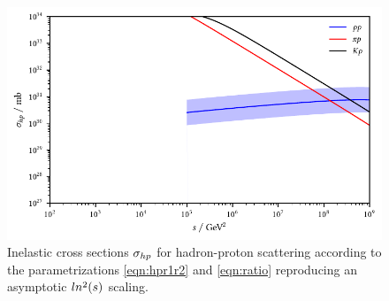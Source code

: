 \begin{figure}[H]
	\centering
	\includegraphics{../plots/build/hadron_proton_scattering.pdf}
	\caption[Inelastic cross sections $\sigma_{h \kern-0.1pt p}$ for hadron-proton scattering.]{Inelastic cross sections
			 $\sigma_{h \kern-0.1pt p}$ for hadron-proton scattering according to the parametrizations \eqref{eqn:hpr1r2}
			 and \eqref{eqn:ratio} reproducing an asymptotic $\cramped{ln^2(s)}$ scaling.}
	\label{fig:hadron-proton-scattering}
\end{figure}

